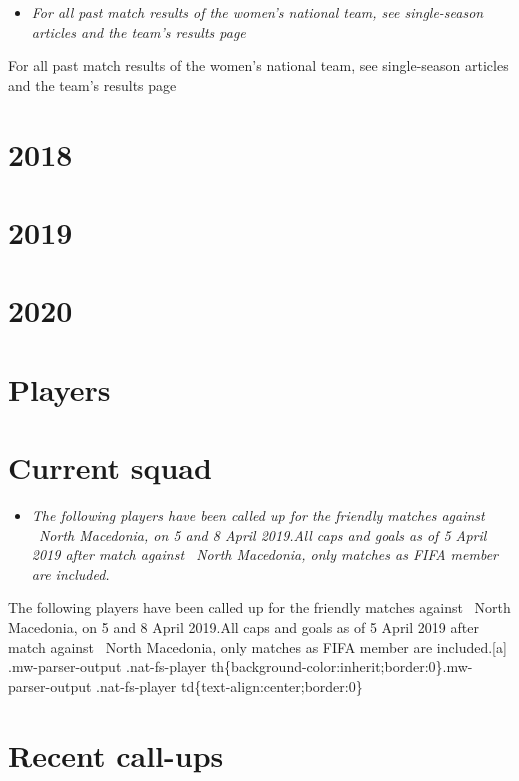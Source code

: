 \begin{itemize}
\item
  \emph{For all past match results of the women's national team, see
  single-season articles and the team's results page}
\end{itemize}

For all past match results of the women's national team, see
single-season articles and the team's results page

\section{2018}\label{section}

\section{2019}\label{section-1}

\section{2020}\label{section-2}

\section{Players}\label{players}

\section{Current squad}\label{current-squad}

\begin{itemize}
\item
  \emph{The following players have been called up for the friendly
  matches against ~North Macedonia, on 5 and 8 April 2019.All caps and
  goals as of 5 April 2019 after match against ~North Macedonia, only
  matches as FIFA member are included.}
\end{itemize}

The following players have been called up for the friendly matches
against ~North Macedonia, on 5 and 8 April 2019.All caps and goals as of
5 April 2019 after match against ~North Macedonia, only matches as FIFA
member are included.{[}a{]}\\
.mw-parser-output .nat-fs-player
th\{background-color:inherit;border:0\}.mw-parser-output .nat-fs-player
td\{text-align:center;border:0\}

\section{Recent call-ups}\label{recent-call-ups}

